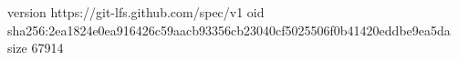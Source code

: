 version https://git-lfs.github.com/spec/v1
oid sha256:2ea1824e0ea916426c59aacb93356cb23040cf5025506f0b41420eddbe9ea5da
size 67914
